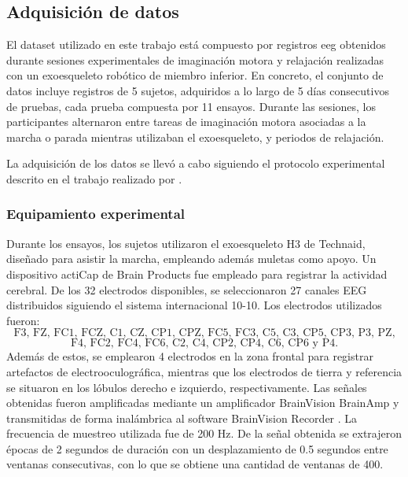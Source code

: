 
\subsection{Adquisición de datos}\label{sec:adquisicion_datos}

El dataset utilizado en este trabajo está compuesto por registros \acrshort{eeg} obtenidos durante sesiones experimentales de imaginación motora y relajación realizadas con un exoesqueleto robótico de miembro inferior. En concreto, el conjunto de datos incluye registros de 5 sujetos, adquiridos a lo largo de 5 días consecutivos de pruebas, cada prueba compuesta por 11 ensayos. Durante las sesiones, los participantes alternaron entre tareas de imaginación motora asociadas a la marcha o parada mientras utilizaban el exoesqueleto, y periodos de relajación.

La adquisición de los datos se llevó a cabo siguiendo el protocolo experimental descrito en el trabajo  realizado por \textcite{ferrero_BMIBased2021}.


\subsubsection{Equipamiento experimental}

Durante los ensayos, los sujetos utilizaron el exoesqueleto H3 de Technaid, diseñado para asistir la marcha, empleando además muletas como apoyo\cite{ferrero_BMIBased2021}. Un dispositivo actiCap de Brain Products fue empleado para registrar la actividad cerebral. De los 32 electrodos disponibles, se seleccionaron 27 canales EEG distribuidos siguiendo el sistema internacional 10-10. Los electrodos utilizados fueron:
\[
    \text{F3, FZ, FC1, FCZ, C1, CZ, CP1, CPZ, FC5, FC3, C5, C3, CP5, CP3, P3, PZ,}
\]
\[
    \text{F4, FC2, FC4, FC6, C2, C4, CP2, CP4, C6, CP6 y P4.}
\]
Además de estos, se emplearon 4 electrodos en la zona frontal para registrar artefactos de electrooculográfica, mientras que los electrodos de tierra y referencia se situaron en los lóbulos derecho e izquierdo, respectivamente.
Las señales obtenidas fueron amplificadas mediante un amplificador BrainVision BrainAmp y transmitidas de forma inalámbrica al software BrainVision Recorder \cite{ferrero_BMIBased2021}. La frecuencia de muestreo utilizada fue de 200 Hz. De la señal obtenida se extrajeron épocas de 2 segundos de duración con un desplazamiento de 0.5 segundos entre ventanas consecutivas, con lo que se obtiene una cantidad de ventanas de 400.

